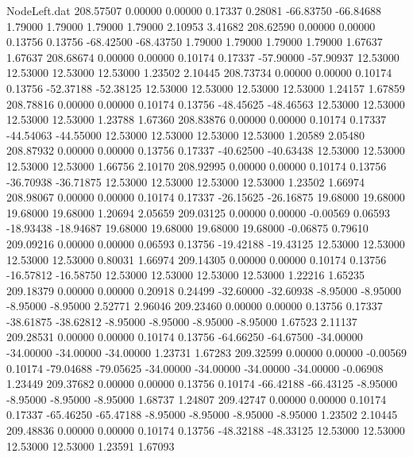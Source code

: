 \begin{filecontents}{NodeLeft.dat}
 208.57507    0.00000    0.00000     0.17337    0.28081  -66.83750  -66.84688    1.79000    1.79000    1.79000    1.79000    2.10953    3.41682
 208.62590    0.00000    0.00000     0.13756    0.13756  -68.42500  -68.43750    1.79000    1.79000    1.79000    1.79000    1.67637    1.67637
 208.68674    0.00000    0.00000     0.10174    0.17337  -57.90000  -57.90937   12.53000   12.53000   12.53000   12.53000    1.23502    2.10445
 208.73734    0.00000    0.00000     0.10174    0.13756  -52.37188  -52.38125   12.53000   12.53000   12.53000   12.53000    1.24157    1.67859
 208.78816    0.00000    0.00000     0.10174    0.13756  -48.45625  -48.46563   12.53000   12.53000   12.53000   12.53000    1.23788    1.67360
 208.83876    0.00000    0.00000     0.10174    0.17337  -44.54063  -44.55000   12.53000   12.53000   12.53000   12.53000    1.20589    2.05480
 208.87932    0.00000    0.00000     0.13756    0.17337  -40.62500  -40.63438   12.53000   12.53000   12.53000   12.53000    1.66756    2.10170
 208.92995    0.00000    0.00000     0.10174    0.13756  -36.70938  -36.71875   12.53000   12.53000   12.53000   12.53000    1.23502    1.66974
 208.98067    0.00000    0.00000     0.10174    0.17337  -26.15625  -26.16875   19.68000   19.68000   19.68000   19.68000    1.20694    2.05659
 209.03125    0.00000    0.00000    -0.00569    0.06593  -18.93438  -18.94687   19.68000   19.68000   19.68000   19.68000   -0.06875    0.79610
 209.09216    0.00000    0.00000     0.06593    0.13756  -19.42188  -19.43125   12.53000   12.53000   12.53000   12.53000    0.80031    1.66974
 209.14305    0.00000    0.00000     0.10174    0.13756  -16.57812  -16.58750   12.53000   12.53000   12.53000   12.53000    1.22216    1.65235
 209.18379    0.00000    0.00000     0.20918    0.24499  -32.60000  -32.60938   -8.95000   -8.95000   -8.95000   -8.95000    2.52771    2.96046
 209.23460    0.00000    0.00000     0.13756    0.17337  -38.61875  -38.62812   -8.95000   -8.95000   -8.95000   -8.95000    1.67523    2.11137
 209.28531    0.00000    0.00000     0.10174    0.13756  -64.66250  -64.67500  -34.00000  -34.00000  -34.00000  -34.00000    1.23731    1.67283
 209.32599    0.00000    0.00000    -0.00569    0.10174  -79.04688  -79.05625  -34.00000  -34.00000  -34.00000  -34.00000   -0.06908    1.23449
 209.37682    0.00000    0.00000     0.13756    0.10174  -66.42188  -66.43125   -8.95000   -8.95000   -8.95000   -8.95000    1.68737    1.24807
 209.42747    0.00000    0.00000     0.10174    0.17337  -65.46250  -65.47188   -8.95000   -8.95000   -8.95000   -8.95000    1.23502    2.10445
 209.48836    0.00000    0.00000     0.10174    0.13756  -48.32188  -48.33125   12.53000   12.53000   12.53000   12.53000    1.23591    1.67093

\end{filecontents}
